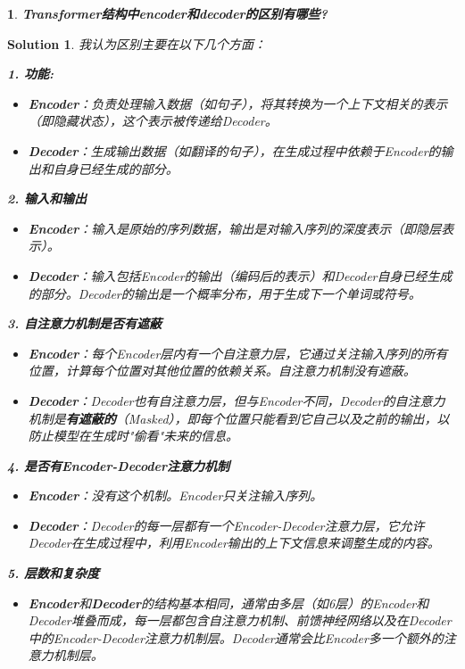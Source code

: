 \documentclass{article}
\newcommand{\hs}[1]{\hspace{{#1}em}} %
\theoremstyle{Problem}
\newtheorem{prob}[subsection]{}
\theoremstyle{Solution}
\newtheorem*{sol}{Solution}
\begin{document}
	\begin{prob}
		\textbf{Transformer结构中encoder和decoder的区别有哪些?}
	\end{prob}
	
	\begin{sol}
	我认为区别主要在以下几个方面：\par
	\hs{0}\textbf{1. 功能:}
	\begin{itemize}
		\item \textbf{Encoder}：负责处理输入数据（如句子），将其转换为一个上下文相关的表示（即隐藏状态），这个表示被传递给Decoder。
		\item \textbf{Decoder}：生成输出数据（如翻译的句子），在生成过程中依赖于Encoder的输出和自身已经生成的部分。
	\end{itemize}
	
	\textbf{2. 输入和输出} 
	\begin{itemize}
		\item \textbf{Encoder}：输入是原始的序列数据，输出是对输入序列的深度表示（即隐层表示）。
		\item \textbf{Decoder}：输入包括Encoder的输出（编码后的表示）和Decoder自身已经生成的部分。Decoder的输出是一个概率分布，用于生成下一个单词或符号。
	\end{itemize}
	
	\textbf{3. 自注意力机制是否有遮蔽} 
	\begin{itemize}
		\item \textbf{Encoder}：每个Encoder层内有一个自注意力层，它通过关注输入序列的所有位置，计算每个位置对其他位置的依赖关系。自注意力机制没有遮蔽。
		\item \textbf{Decoder}：Decoder也有自注意力层，但与Encoder不同，Decoder的自注意力机制是\textbf{有遮蔽的}（Masked），即每个位置只能看到它自己以及之前的输出，以防止模型在生成时"偷看"未来的信息。
	\end{itemize}
	
	\textbf{4. 是否有Encoder-Decoder注意力机制} 
	\begin{itemize}
		\item \textbf{Encoder}：没有这个机制。Encoder只关注输入序列。
		\item \textbf{Decoder}：Decoder的每一层都有一个Encoder-Decoder注意力层，它允许Decoder在生成过程中，利用Encoder输出的上下文信息来调整生成的内容。
	\end{itemize}
	
	\textbf{5. 层数和复杂度} 
	\begin{itemize}
		\item \textbf{Encoder}和\textbf{Decoder}的结构基本相同，通常由多层（如6层）的Encoder和Decoder堆叠而成，每一层都包含自注意力机制、前馈神经网络以及在Decoder中的Encoder-Decoder注意力机制层。Decoder通常会比Encoder多一个额外的注意力机制层。
	\end{itemize}
		
	\end{sol}
	
\end{document}
